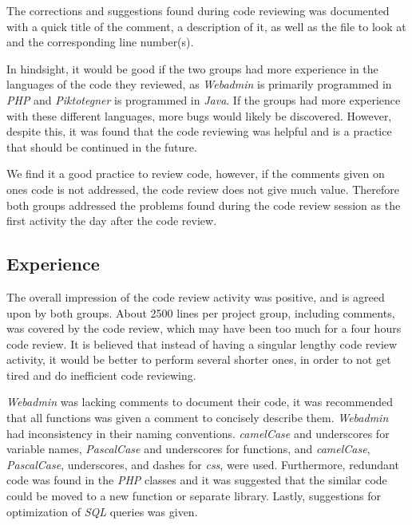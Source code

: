 The corrections and suggestions found during code reviewing was documented with a quick title of the comment, a description of it, as well as the file to look at and the corresponding line number(s).

In hindsight, it would be good if the two groups had more experience in the languages of the code they reviewed, as \textit{Webadmin} is primarily programmed in \textit{PHP} and \textit{Piktotegner} is programmed in \textit{Java}.
If the groups had more experience with these different languages, more bugs would likely be discovered.
However, despite this, it was found that the code reviewing was helpful and is a practice that should be continued in the future.

We find it a good practice to review code, however, if the comments given on ones code is not addressed, the code review does not give much value.
Therefore both groups addressed the problems found during the code review session as the first activity the day after the code review.

\subsection*{Experience}
The overall impression of the code review activity was positive, and is agreed upon by both groups.
About 2500 lines per project group, including comments, was covered by the code review, which may have been too much for a four hours code review.
It is believed that instead of having a singular lengthy code review activity, it would be better to perform several shorter ones, in order to not get tired and do inefficient code reviewing.

\textit{Webadmin} was lacking comments to document their code, it was recommended that all functions was given a comment to concisely describe them. 
\textit{Webadmin} had inconsistency in their naming conventions. 
\textit{camelCase} and underscores for variable names, \textit{PascalCase} and underscores for functions, and \textit{camelCase}, \textit{PascalCase}, underscores, and dashes for \textit{css}, were used. 
Furthermore, redundant code was found in the \textit{PHP} classes and it was suggested that the similar code could be moved to a new function or separate library. 
Lastly, suggestions for optimization of \textit{SQL} queries was given.

